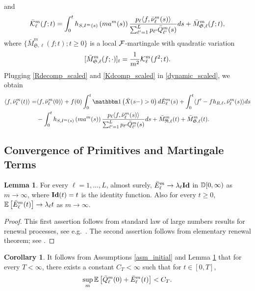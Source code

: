 \documentclass{article}
\theoremstyle{definition}
\newtheorem{lemma}[theorem]{Lemma}
\newtheorem{corollary}[theorem]{Corollary}
\numberwithin{equation}{section}
\begin{document}
and
\begin{equation}\label{Kdcomp_scaled}
    \bar{\mathcal{K}}^m_\ell(f;t)= \int_0^t h_{S,I^m(s)}\left(ma^m(s)\right)\frac{p_\ell \langle f,\bar{\nu}^m_\ell(s)\rangle }{\sum_{\ell'=1}^Lp_{\ell'}\bar {Q}^m_{\ell'}(s)} ds +  \bar M^m_{\mathfrak{S},\ell}(f;t),
\end{equation}
where $\{\bar M^m_{\mathfrak{S},\ell}(f;t);t\geq0\}$ is a local $\mathcal{F}$-martingale with quadratic variation
\begin{equation}\label{MS_QV}
[\bar M^m_{\mathfrak{S},\ell}(f;\cdot)]_t=\frac{1}{m^2}\mathcal{K}^m_\ell(f^2;t).
\end{equation}
Plugging \eqref{Rdecomp_scaled} and \eqref{Kdcomp_scaled} in \eqref{dynamic_scaled}, we obtain
\begin{align}\label{dynamic_scaled}
    \langle f,\bnu^m_\ell(t) \rangle = & \langle f,\bnu^m_\ell(0)\rangle + f(0)\int_0^t \indic{\bx(s-)>0} d \barrival^m_\ell(s) + \int_0^t \langle f'-fh_{R,\ell},\bnu^m_\ell(s)\rangle ds \notag\\
    & - \int_0^t h_{S,\class^m(s)}\left(m\age^m(s)\right)\frac{\weight_\ell \langle f,\bnu^m_\ell(s)\rangle }{\sum_{\ell'=1}^L\weight_{\ell'}\bql^m_{\ell'}(s)} ds +  \bar M^m_{\mathfrak{R},\ell}(t)+\bar M^m_{\mathfrak{S},\ell}(t).
\end{align}

\subsection{Convergence of Primitives and Martingale Terms}\label{sec_LLN}

\begin{lemma}\label{lem_Econv}
  For every $\ell=1,...,L$, almost surely, $\bar E^m_\ell \to \lambda_\ell \textbf{Id} $ in $\mathbb{D}[0,\infty)$ as $m\to\infty$, where $\textbf{Id}(t)=t$ is the identity function. Also for every $t\geq0$, $\mathbb{E}\left[\bar E^m_\ell(t)\right]\to \lambda_\ell t$ as $m\to\infty$.
\end{lemma}
\begin{proof}
  This first assertion follows from standard law of large numbers results for renewal processes, see e.g.\ \cite[Theorem 5.10]{CheYao2001}. The second assertion follows from elementary renewal theorem; see \cite[Proposition V.1.4]{Asm03}.
\end{proof}

\begin{corollary}
  It follows from Assumptions \ref{asm_initial} and Lemma \ref{lem_Econv} that for every $T<\infty$, there exists a constant $C_T<\infty$ such that for $t\in[0,T]$,
  \begin{equation}\label{ineq_initial}
    \sup_m\mathbb{E}\left[\bar {Q}^m_\ell(0)+\bar E_\ell^m(t)\right]<C_T.
  \end{equation}
\end{corollary}
\end{document}
